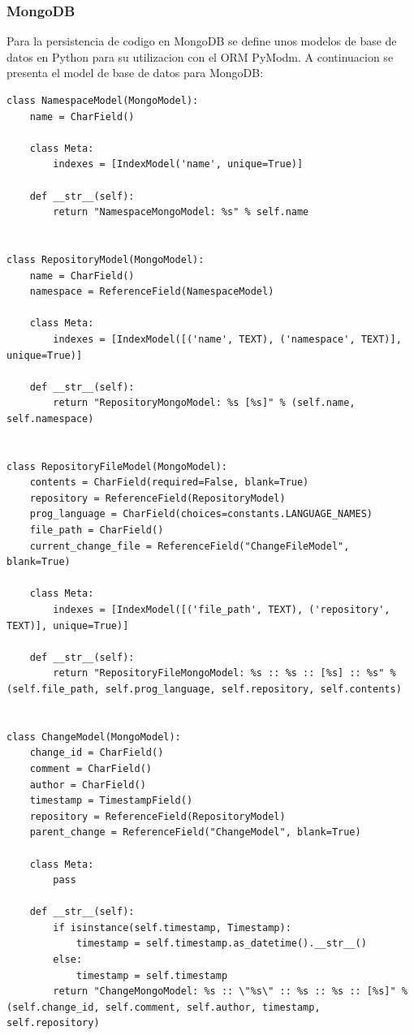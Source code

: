 \subsubsection{MongoDB}
Para la persistencia de codigo en MongoDB se define unos modelos de base de datos en Python para su utilizacion con el ORM PyModm. A continuacion se presenta el model de base de datos para MongoDB:
\lstset{language=Python}
\begin{lstlisting}[breaklines]
class NamespaceModel(MongoModel):
    name = CharField()

    class Meta:
        indexes = [IndexModel('name', unique=True)]

    def __str__(self):
        return "NamespaceMongoModel: %s" % self.name


class RepositoryModel(MongoModel):
    name = CharField()
    namespace = ReferenceField(NamespaceModel)

    class Meta:
        indexes = [IndexModel([('name', TEXT), ('namespace', TEXT)], unique=True)]

    def __str__(self):
        return "RepositoryMongoModel: %s [%s]" % (self.name, self.namespace)


class RepositoryFileModel(MongoModel):
    contents = CharField(required=False, blank=True)
    repository = ReferenceField(RepositoryModel)
    prog_language = CharField(choices=constants.LANGUAGE_NAMES)
    file_path = CharField()
    current_change_file = ReferenceField("ChangeFileModel", blank=True)

    class Meta:
        indexes = [IndexModel([('file_path', TEXT), ('repository', TEXT)], unique=True)]

    def __str__(self):
        return "RepositoryFileMongoModel: %s :: %s :: [%s] :: %s" % (self.file_path, self.prog_language, self.repository, self.contents)


class ChangeModel(MongoModel):
    change_id = CharField()
    comment = CharField()
    author = CharField()
    timestamp = TimestampField()
    repository = ReferenceField(RepositoryModel)
    parent_change = ReferenceField("ChangeModel", blank=True)

    class Meta:
        pass

    def __str__(self):
        if isinstance(self.timestamp, Timestamp):
            timestamp = self.timestamp.as_datetime().__str__()
        else:
            timestamp = self.timestamp
        return "ChangeMongoModel: %s :: \"%s\" :: %s :: %s :: [%s]" % (self.change_id, self.comment, self.author, timestamp, self.repository)



\end{lstlisting}
